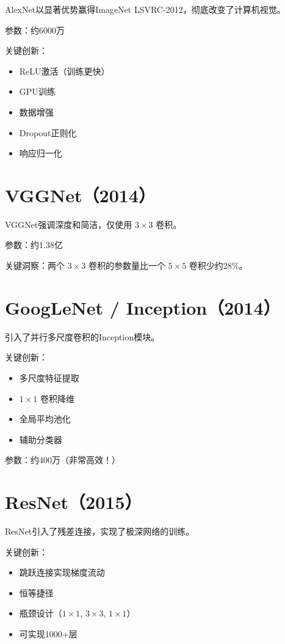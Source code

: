 AlexNet以显著优势赢得ImageNet LSVRC-2012，彻底改变了计算机视觉。

参数：约6000万

关键创新：
\begin{itemize}
    \item ReLU激活（训练更快）
    \item GPU训练
    \item 数据增强
    \item Dropout正则化
    \item 响应归一化
\end{itemize}

\section{VGGNet（2014）}

VGGNet强调深度和简洁，仅使用 $3\times3$ 卷积。

参数：约1.38亿

关键洞察：两个 $3\times3$ 卷积的参数量比一个 $5\times5$ 卷积少约28\%。

\section{GoogLeNet / Inception（2014）}

引入了并行多尺度卷积的Inception模块。

关键创新：
\begin{itemize}
    \item 多尺度特征提取
    \item $1\times1$ 卷积降维
    \item 全局平均池化
    \item 辅助分类器
\end{itemize}

参数：约400万（非常高效！）

\section{ResNet（2015）}

ResNet引入了残差连接，实现了极深网络的训练。

关键创新：
\begin{itemize}
    \item 跳跃连接实现梯度流动
    \item 恒等捷径
    \item 瓶颈设计（$1\times1$, $3\times3$, $1\times1$）
    \item 可实现1000+层
\end{itemize}

